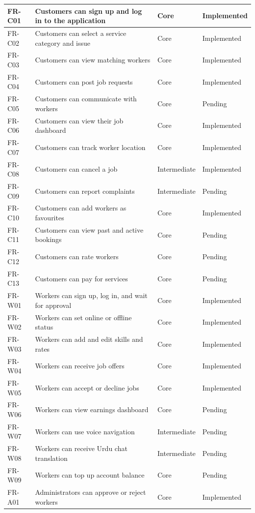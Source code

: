 \begin{longtable}{|>{\centering\arraybackslash}p{1.5cm}|>{\raggedright\arraybackslash}p{7.0cm}|>{\centering\arraybackslash}p{2.2cm}|>{\centering\arraybackslash}p{2.5cm}|}
FR-C01 & Customers can sign up and log in to the application & Core & Implemented \\ \hline
FR-C02 & Customers can select a service category and issue & Core & Implemented \\ \hline
FR-C03 & Customers can view matching workers & Core & Implemented \\ \hline
FR-C04 & Customers can post job requests & Core & Implemented \\ \hline
FR-C05 & Customers can communicate with workers & Core & Pending \\ \hline
FR-C06 & Customers can view their job dashboard & Core & Implemented \\ \hline
FR-C07 & Customers can track worker location & Core & Implemented \\ \hline
FR-C08 & Customers can cancel a job & Intermediate & Implemented \\ \hline
FR-C09 & Customers can report complaints & Intermediate & Pending \\ \hline
FR-C10 & Customers can add workers as favourites & Core & Implemented \\ \hline
FR-C11 & Customers can view past and active bookings & Core & Pending \\ \hline
FR-C12 & Customers can rate workers & Core & Pending \\ \hline
FR-C13 & Customers can pay for services & Core & Pending \\ \hline
FR-W01 & Workers can sign up, log in, and wait for approval & Core & Implemented \\ \hline
FR-W02 & Workers can set online or offline status & Core & Implemented \\ \hline
FR-W03 & Workers can add and edit skills and rates & Core & Implemented \\ \hline
FR-W04 & Workers can receive job offers & Core & Implemented \\ \hline
FR-W05 & Workers can accept or decline jobs & Core & Implemented \\ \hline
FR-W06 & Workers can view earnings dashboard & Core & Pending \\ \hline
FR-W07 & Workers can use voice navigation & Intermediate & Pending \\ \hline
FR-W08 & Workers can receive Urdu chat translation & Intermediate & Pending \\ \hline
FR-W09 & Workers can top up account balance & Core & Pending \\ \hline
FR-A01 & Administrators can approve or reject workers & Core & Implemented \\ \hline

\end{longtable}
